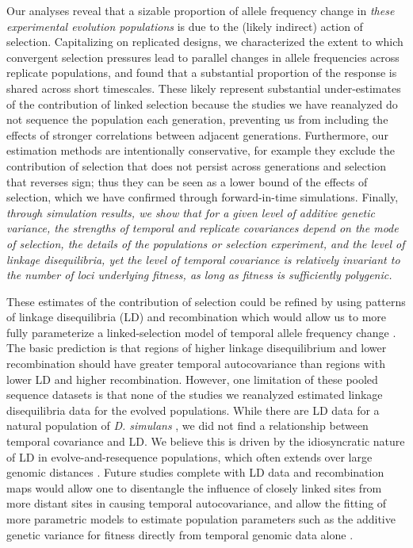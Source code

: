 \documentclass[9pt,twocolumn,twoside]{pnas-new}
\newcommand{\vb}[1]{{\it \color{red} #1}}
\begin{document}
Our analyses reveal that a sizable proportion of allele frequency change in
\vb{these experimental evolution populations} is due to the (likely indirect)
action of selection. Capitalizing on replicated designs, we characterized the
extent to which convergent selection pressures lead to parallel changes in
allele frequencies across replicate populations, and found that a substantial
proportion of the response is shared across short timescales.  These likely
represent substantial under-estimates of the contribution of linked selection
because the studies we have reanalyzed do not sequence the population each
generation, preventing us from including the effects of stronger correlations
between adjacent generations. Furthermore, our estimation methods are
intentionally conservative, for example they exclude the contribution of
selection that does not persist across generations and selection that reverses
sign; thus they can be seen as a lower bound of the effects of selection, which
we have confirmed through forward-in-time simulations. Finally, \vb{through
  simulation results, we show that for a given level of additive genetic
  variance, the strengths of temporal and replicate covariances depend on the
  mode of selection, the details of the populations or selection experiment,
  and the level of linkage disequilibria, yet the level of temporal covariance
  is relatively invariant to the number of loci underlying fitness, as long as
fitness is sufficiently polygenic.} 

These estimates of the contribution of selection could be refined by using
patterns of linkage disequilibria (LD) and recombination which would allow
us to more fully parameterize a linked-selection model of temporal allele
frequency change \cite{Buffalo2019-io}. The basic prediction is that
regions of higher linkage disequilibrium and lower recombination should have
greater temporal autocovariance than regions with lower LD and higher
recombination. However, one limitation of these pooled sequence datasets is
that none of the studies we reanalyzed estimated linkage disequilibria data for
the evolved populations.  While there are LD data for a natural population of
\emph{D. simulans} \cite{Signor2018-wg,Howie2018-ay},  we did not find a
relationship between temporal covariance and LD.  We believe this is driven by
the idiosyncratic nature of LD in evolve-and-resequence populations, which
often extends over large genomic distances
\cite{Nuzhdin2013-gf,Kelly2019-dc}. Future studies complete with LD data
and recombination maps would allow one to disentangle the influence of closely
linked sites from more distant sites in causing temporal autocovariance, and
allow the fitting of more parametric models to estimate population parameters
such as the additive genetic variance for fitness directly from temporal
genomic data alone \cite{Buffalo2019-io}.
\end{document}
